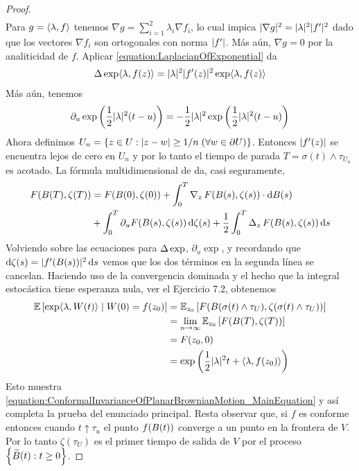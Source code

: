 \begin{proof}
\begin{align}
  \end{align}
  Para \(g = \langle\lambda , f\rangle\) tenemos \(\nabla g = \sum_{i = 1}^2 \lambda_i \nabla f_i\), lo cual impica \(\lvert\nabla g\rvert^2 = \lvert\lambda\rvert^2 \lvert f'\rvert^2\) dado que los vectores \(\nabla f_i\) son ortogonales con norma \(\lvert f'\rvert\).
  Más aún, \(\nabla g = 0\) por la analiticidad de \(f\).
  Aplicar \ref{equation:LaplacianOfExponential} da
  \begin{align}
    \operatorname{\Delta} \exp \langle\lambda, f(z)\rangle
    =
    \lvert\lambda\rvert^2 \lvert f'(z)\rvert^2 \exp \langle\lambda, f(z)\rangle
  \end{align}
  Más aún, tenemos
  \begin{align}
    \partial_u \exp\left( \frac{1}{2} \lvert\lambda\rvert^2 (t - u) \right)
    =
    - \frac{1}{2} \lvert\lambda\rvert^2 \exp\left( \frac{1}{2} \lvert\lambda\rvert^2 (t - u)\right)
  \end{align}
  Ahora definimos \(U_n = \{z \in U : \lvert z - w\rvert \geq 1 / n \;(\forall w \in \partial U)\}\).
  Entonces \(\lvert f'(z)\rvert\) se encuentra lejos de cero en \(U_n\) y por lo tanto el tiempo de parada \(T = \sigma(t) \wedge \tau_{U_n}\) es acotado.
  La fórmula multidimensional de \ito{} da, casi seguramente,
  \begin{align}
    F(B(T), \zeta(T))
    &=
    F(B(0), \zeta(0))
    + \int_0^T \operatorname{\nabla}_z F(B(s), \zeta(s)) \cdot \mathop{}\!\mathrm{d} B(s)
    \\
    &+
    \int_0^T \partial_u F(B(s), \zeta(s)) \mathop{}\!\mathrm{d} \zeta(s)
    + \frac{1}{2} \int_0^T \operatorname{\Delta}_z F(B(s), \zeta(s)) \mathop{}\!\mathrm{d} s
  \end{align}
  Volviendo sobre las ecuaciones para \(\operatorname{\Delta} \exp\), \(\partial_u \exp\), y recordando que \(\mathop{}\!\mathrm{d} \zeta(s) = \lvert f'(B(s))\rvert^2 \mathop{}\!\mathrm{d} s\) vemos que los dos términos en la segunda línea se cancelan.
  Haciendo uso de la convergencia dominada y el hecho que la integral estocástica tiene esperanza nula, ver el Ejercicio 7.2, obtenemos
  \begin{align}
    \operatorname{\mathbb{E}} \left[
      \exp \langle\lambda, W(t)\rangle
      \mid
      W(0) = f(z_0)
    \right]
    &=
    \operatorname{\mathbb{E}}_{z_0} \left[ F(B(\sigma(t) \wedge \tau_U), \zeta(\sigma(t) \wedge \tau_U))\right]
    \\
    &=
    \lim_{n \rightarrow \infty} \operatorname{\mathbb{E}}_{z_0} \left[F(B(T), \zeta(T))\right]
    \\
    &=
    F(z_0, 0)
    \\
    &=
    \exp \left( \frac{1}{2} \lvert\lambda\rvert^2 t + \langle\lambda, f(z_0)\rangle \right)
  \end{align}
  Esto muestra \eqref{equation:ConformalInvarianceOfPlanarBrownianMotion_MainEquation} y así completa la prueba del enunciado principal.
  Resta observar que, si \(f\) es conforme entonces cuando \(t \uparrow \tau_u\) el punto \(f(B(t))\) converge a un punto en la frontera de \(V\).
  Por lo tanto \(\zeta(\tau_U)\) es el primer tiempo de salida de \(V\) por el proceso \(\left\{ \widetilde{B}(t) : t \geq 0 \right\}\).
\end{proof}

